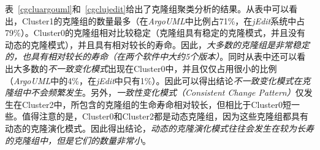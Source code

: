 {%

表~\ref{cgcluargouml}和~\ref{cgclujedit}给出了克隆组聚类分析的结果。从表中可以看出，Cluster1的克隆组的数量最多（在{\em ArgoUML}中比例占71\%，在{\em jEdit}系统中占79\%）。Cluster0的克隆组相对比较稳定（克隆组具有稳定的克隆模式，并且没有动态的克隆模式），并且具有相对较长的寿命。因此，{\em 大多数的克隆组是非常稳定的，也具有相对较长的寿命（在两个软件中大约5个版本）}。同时从表中还可以看出大多数的{\em 不一致变化模式}出现在Cluster0中，并且仅仅占用很小的比例（{\em ArgoUML}中的4\%，在{\em jEdit}中只有1\%）。因此可以得出结论{\em 不一致变化模式在克隆组中不会频繁发生}。另外，{\em  一致性变化模式（Consistent Change Pattern）}仅发生在Cluster2中，所包含的克隆组的生命寿命相对较长，但相比于Cluster0短一些。值得注意的是，Cluster0和Cluster2都是动态克隆组，因为这些克隆组都具有动态的克隆演化模式。因此得出结论，{\em  动态的克隆演化模式往往会发生在较为长寿的克隆组中，但是它们的数量非常小}。

}
